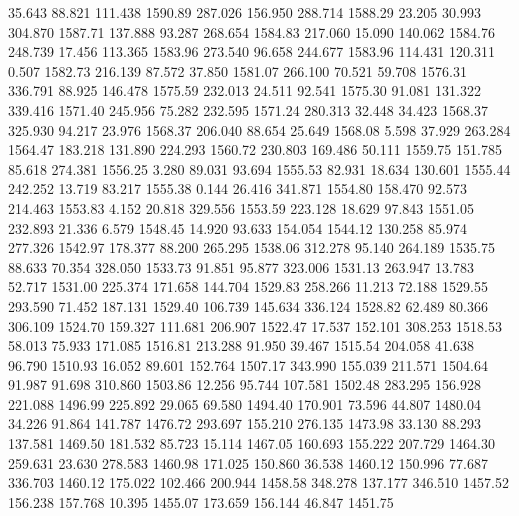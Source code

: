   35.643   88.821  111.438      1590.89
 287.026  156.950  288.714      1588.29
  23.205   30.993  304.870      1587.71
 137.888   93.287  268.654      1584.83
 217.060   15.090  140.062      1584.76
 248.739   17.456  113.365      1583.96
 273.540   96.658  244.677      1583.96
 114.431  120.311    0.507      1582.73
 216.139   87.572   37.850      1581.07
 266.100   70.521   59.708      1576.31
 336.791   88.925  146.478      1575.59
 232.013   24.511   92.541      1575.30
  91.081  131.322  339.416      1571.40
 245.956   75.282  232.595      1571.24
 280.313   32.448   34.423      1568.37
 325.930   94.217   23.976      1568.37
 206.040   88.654   25.649      1568.08
   5.598   37.929  263.284      1564.47
 183.218  131.890  224.293      1560.72
 230.803  169.486   50.111      1559.75
 151.785   85.618  274.381      1556.25
   3.280   89.031   93.694      1555.53
  82.931   18.634  130.601      1555.44
 242.252   13.719   83.217      1555.38
   0.144   26.416  341.871      1554.80
 158.470   92.573  214.463      1553.83
   4.152   20.818  329.556      1553.59
 223.128   18.629   97.843      1551.05
 232.893   21.336    6.579      1548.45
  14.920   93.633  154.054      1544.12
 130.258   85.974  277.326      1542.97
 178.377   88.200  265.295      1538.06
 312.278   95.140  264.189      1535.75
  88.633   70.354  328.050      1533.73
  91.851   95.877  323.006      1531.13
 263.947   13.783   52.717      1531.00
 225.374  171.658  144.704      1529.83
 258.266   11.213   72.188      1529.55
 293.590   71.452  187.131      1529.40
 106.739  145.634  336.124      1528.82
  62.489   80.366  306.109      1524.70
 159.327  111.681  206.907      1522.47
  17.537  152.101  308.253      1518.53
  58.013   75.933  171.085      1516.81
 213.288   91.950   39.467      1515.54
 204.058   41.638   96.790      1510.93
  16.052   89.601  152.764      1507.17
 343.990  155.039  211.571      1504.64
  91.987   91.698  310.860      1503.86
  12.256   95.744  107.581      1502.48
 283.295  156.928  221.088      1496.99
 225.892   29.065   69.580      1494.40
 170.901   73.596   44.807      1480.04
  34.226   91.864  141.787      1476.72
 293.697  155.210  276.135      1473.98
  33.130   88.293  137.581      1469.50
 181.532   85.723   15.114      1467.05
 160.693  155.222  207.729      1464.30
 259.631   23.630  278.583      1460.98
 171.025  150.860   36.538      1460.12
 150.996   77.687  336.703      1460.12
 175.022  102.466  200.944      1458.58
 348.278  137.177  346.510      1457.52
 156.238  157.768   10.395      1455.07
 173.659  156.144   46.847      1451.75
